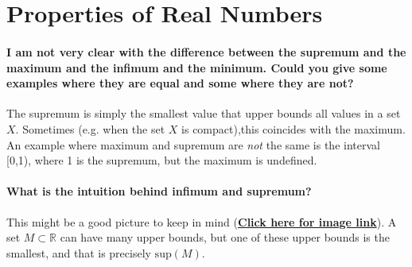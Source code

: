 \documentclass[10pt,english]{article}
\begin{document}

\section{Properties of Real Numbers}

\paragraph{I am not very clear with the difference between the supremum and the maximum and the infimum and the minimum. Could you give some examples where they are equal and some where they are not?}
The supremum is simply the smallest value that upper bounds all values in a set $X$. Sometimes (e.g. when the set $X$ is compact),this coincides with the maximum. An example where maximum and supremum are \textit{not} the same is the interval [0,1), where 1 is the supremum, but the maximum is undefined.

\paragraph{What is the intuition behind infimum and supremum?}

This might be a good picture to keep in mind (\href{https://en.wikipedia.org/wiki/Infimum_and_supremum#/media/File:Illustration_of_supremum.svg}{\textbf{Click here for image link}}). A set $M\subset \mathbb{R}$ can have many upper bounds, but one of these upper bounds is the smallest, and that is precisely $\text{sup}(M)$.
\end{document}
